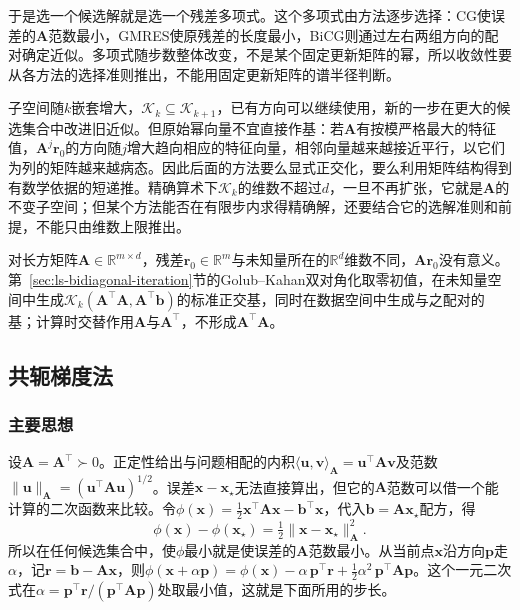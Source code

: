 于是选一个候选解就是选一个残差多项式。这个多项式由方法逐步选择：CG使误差的$\bm A$范数最小，GMRES使原残差的长度最小，BiCG则通过左右两组方向的配对确定近似。多项式随步数整体改变，不是某个固定更新矩阵的幂，所以收敛性要从各方法的选择准则推出，不能用固定更新矩阵的谱半径判断。

子空间随$k$嵌套增大，$\mathcal K_k\subseteq\mathcal K_{k+1}$，已有方向可以继续使用，新的一步在更大的候选集合中改进旧近似。但原始幂向量不宜直接作基：若$\bm A$有按模严格最大的特征值，$\bm A^j\bm r_0$的方向随$j$增大趋向相应的特征向量，相邻向量越来越接近平行，以它们为列的矩阵越来越病态。因此后面的方法要么显式正交化，要么利用矩阵结构得到有数学依据的短递推。精确算术下$\mathcal K_k$的维数不超过$d$，一旦不再扩张，它就是$\bm A$的不变子空间；但某个方法能否在有限步内求得精确解，还要结合它的选解准则和前提，不能只由维数上限推出。

对长方矩阵$\bm A\in\mathbb R^{m\times d}$，残差$\bm r_0\in\mathbb R^m$与未知量所在的$\mathbb R^d$维数不同，$\bm A\bm r_0$没有意义。第~\ref{sec:ls-bidiagonal-iteration}节的Golub--Kahan双对角化取零初值，在未知量空间中生成$\mathcal K_k(\bm A^\top\bm A,\bm A^\top\bm b)$的标准正交基，同时在数据空间中生成与之配对的基；计算时交替作用$\bm A$与$\bm A^\top$，不形成$\bm A^\top\bm A$。

\subsection{共轭梯度法}
\label{sec:ls-conjugate-gradient}

\subsubsection{主要思想}

设$\bm A=\bm A^\top\succ0$。正定性给出与问题相配的内积$\langle\bm u,\bm v\rangle_{\bm A}=\bm u^\top\bm A\bm v$及范数$\lVert\bm u\rVert_{\bm A}=(\bm u^\top\bm A\bm u)^{1/2}$。误差$\bm x-\bm x_\star$无法直接算出，但它的$\bm A$范数可以借一个能计算的二次函数来比较。令$\phi(\bm x)=\tfrac12\bm x^\top\bm A\bm x-\bm b^\top\bm x$，代入$\bm b=\bm A\bm x_\star$配方，得
\[
 \phi(\bm x)-\phi(\bm x_\star)=\tfrac12\lVert\bm x-\bm x_\star\rVert_{\bm A}^2 .
\]
所以在任何候选集合中，使$\phi$最小就是使误差的$\bm A$范数最小。从当前点$\bm x$沿方向$\bm p$走$\alpha$，记$\bm r=\bm b-\bm A\bm x$，则$\phi(\bm x+\alpha\bm p)=\phi(\bm x)-\alpha\,\bm p^\top\bm r+\tfrac12\alpha^2\,\bm p^\top\bm A\bm p$。这个一元二次式在$\alpha=\bm p^\top\bm r/(\bm p^\top\bm A\bm p)$处取最小值，这就是下面所用的步长。

